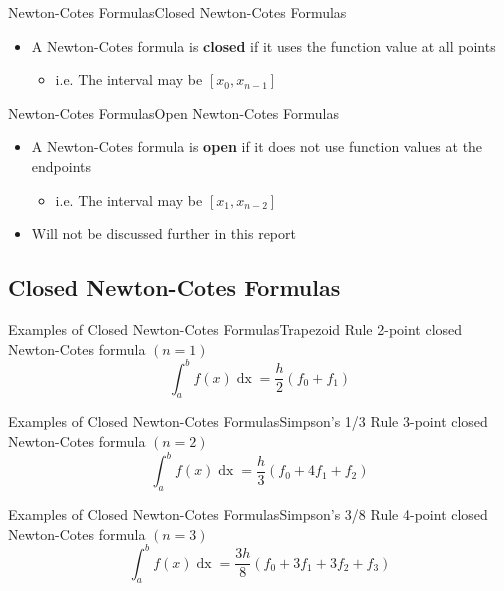 \documentclass{beamer}
\begin{document}
\begin{frame}{Newton-Cotes Formulas}{Closed Newton-Cotes Formulas}
  \begin{itemize}
    \item A Newton-Cotes formula is \textbf{closed} if it uses the function value at all points
    \begin{itemize}
      \item i.e. The interval may be $[x_0,x_{n-1}]$
    \end{itemize} 
  \end{itemize}
\end{frame}

\begin{frame}{Newton-Cotes Formulas}{Open Newton-Cotes Formulas}
  \begin{itemize}
    \item A Newton-Cotes formula is \textbf{open} if it does not use function values at the endpoints
    \begin{itemize}
      \item i.e. The interval may be $[x_1,x_{n-2}]$
    \end{itemize} 
    \item Will not be discussed further in this report
  \end{itemize}
\end{frame}

\subsection{Closed Newton-Cotes Formulas}

\begin{frame}{Examples of Closed Newton-Cotes Formulas}{Trapezoid Rule}
    2-point closed Newton-Cotes formula $\left(n = 1\right)$
    \begin{equation}
      \int_a^b f(x) \mathop{dx} = \dfrac{h}{2} \left(f_0 + f_1\right)
    \end{equation}
\end{frame}

\begin{frame}{Examples of Closed Newton-Cotes Formulas}{Simpson's 1/3 Rule}
    3-point closed Newton-Cotes formula $\left(n = 2\right)$
    \begin{equation}
      \int_a^b f(x) \mathop{dx} = \dfrac{h}{3} \left(f_0 + 4f_1 + f_2\right)
    \end{equation}
\end{frame}

\begin{frame}{Examples of Closed Newton-Cotes Formulas}{Simpson's 3/8 Rule}
    4-point closed Newton-Cotes formula $\left(n = 3\right)$
    \begin{equation}
      \int_a^b f(x) \mathop{dx} = \dfrac{3h}{8} \left(f_0 + 3f_1 + 3f_2 + f_3\right)
    \end{equation}
\end{frame}
\end{document}
